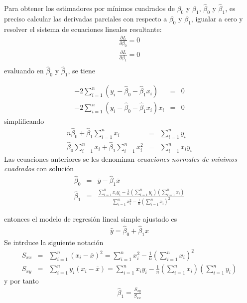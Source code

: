 Para obtener los estimadores por m\'inimos cuadrados de $\beta_{0}$ y $\beta_{1}$, $\hat{\beta}_{0}$ y $\hat{\beta}_{1}$, es preciso calcular las derivadas parciales con respecto a $\beta_{0}$ y $\beta_{1}$, igualar a cero y resolver el sistema de ecuaciones lineales resultante:
\begin{eqnarray*}
\frac{\partial L}{\partial \beta_{0}}=0\\
\frac{\partial L}{\partial \beta_{1}}=0\\
\end{eqnarray*}
evaluando en $\hat{\beta}_{0}$ y $\hat{\beta}_{1}$, se tiene

\begin{eqnarray*}
-2\sum_{i=1}^{n}\left(y_{i}-\hat{\beta}_{0}-\hat{\beta}_{1}x_{i}\right)&=&0\\
-2\sum_{i=1}^{n}\left(y_{i}-\hat{\beta}_{0}-\hat{\beta}_{1}x_{i}\right)x_{i}&=&0
\end{eqnarray*}
simplificando
\begin{eqnarray*}
n\hat{\beta}_{0}+\hat{\beta}_{1}\sum_{i=1}^{n}x_{i}&=&\sum_{i=1}^{n}y_{i}\\
\hat{\beta}_{0}\sum_{i=1}^{n}x_{i}+\hat{\beta}_{1}\sum_{i=1}^{n}x_{i}^{2}&=&\sum_{i=1}^{n}x_{i}y_{i}
\end{eqnarray*}
Las ecuaciones anteriores se les denominan \textit{ecuaciones normales de m\'inimos cuadrados} con soluci\'on
\begin{eqnarray}\label{Ecs.Estimadores.Regresion}
\hat{\beta}_{0}&=&\overline{y}-\hat{\beta}_{1}\overline{x}\\
\hat{\beta}_{1}&=&\frac{\sum_{i=1}^{n}x_{i}y_{i}-\frac{1}{n}\left(\sum_{i=1}^{n}y_{i}\right)\left(\sum_{i=1}^{n}x_{i}\right)}{\sum_{i=1}^{n}x_{i}^{2}-\frac{1}{n}\left(\sum_{i=1}^{n}x_{i}\right)^{2}}
\end{eqnarray}





entonces el modelo de regresi\'on lineal simple ajustado es
\begin{eqnarray}
\hat{y}=\hat{\beta}_{0}+\hat{\beta}_{1}x
\end{eqnarray}
Se intrduce la siguiente notaci\'on
\begin{eqnarray}
S_{xx}&=&\sum_{i=1}^{n}\left(x_{i}-\overline{x}\right)^{2}=\sum_{i=1}^{n}x_{i}^{2}-\frac{1}{n}\left(\sum_{i=1}^{n}x_{i}\right)^{2}\\
S_{xy}&=&\sum_{i=1}^{n}y_{i}\left(x_{i}-\overline{x}\right)=\sum_{i=1}^{n}x_{i}y_{i}-\frac{1}{n}\left(\sum_{i=1}^{n}x_{i}\right)\left(\sum_{i=1}^{n}y_{i}\right)
\end{eqnarray}
y por tanto
\begin{eqnarray}
\hat{\beta}_{1}=\frac{S_{xy}}{S_{xx}}
\end{eqnarray}




